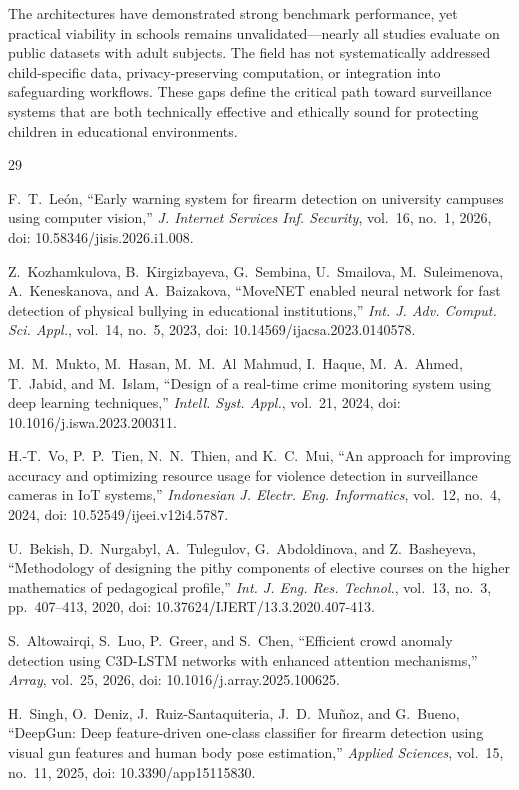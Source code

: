 \documentclass[conference]{IEEEtran}
\begin{document}
The architectures have demonstrated strong benchmark performance, yet practical viability in schools remains unvalidated---nearly all studies evaluate on public datasets with adult subjects. The field has not systematically addressed child-specific data, privacy-preserving computation, or integration into safeguarding workflows. These gaps define the critical path toward surveillance systems that are both technically effective and ethically sound for protecting children in educational environments.

\begin{thebibliography}{29}
\renewcommand{\bibfont}{\scriptsize}

 F.~T.~Le\'{o}n, ``Early warning system for firearm detection on university campuses using computer vision,'' \textit{J. Internet Services Inf. Security}, vol.~16, no.~1, 2026, doi: 10.58346/jisis.2026.i1.008.

 Z.~Kozhamkulova, B.~Kirgizbayeva, G.~Sembina, U.~Smailova, M.~Suleimenova, A.~Keneskanova, and A.~Baizakova, ``MoveNET enabled neural network for fast detection of physical bullying in educational institutions,'' \textit{Int. J. Adv. Comput. Sci. Appl.}, vol.~14, no.~5, 2023, doi: 10.14569/ijacsa.2023.0140578.

 M.~M.~Mukto, M.~Hasan, M.~M.~Al~Mahmud, I.~Haque, M.~A.~Ahmed, T.~Jabid, and M.~Islam, ``Design of a real-time crime monitoring system using deep learning techniques,'' \textit{Intell. Syst. Appl.}, vol.~21, 2024, doi: 10.1016/j.iswa.2023.200311.

 H.-T.~Vo, P.~P.~Tien, N.~N.~Thien, and K.~C.~Mui, ``An approach for improving accuracy and optimizing resource usage for violence detection in surveillance cameras in IoT systems,'' \textit{Indonesian J. Electr. Eng. Informatics}, vol.~12, no.~4, 2024, doi: 10.52549/ijeei.v12i4.5787.

 U.~Bekish, D.~Nurgabyl, A.~Tulegulov, G.~Abdoldinova, and Z.~Basheyeva, ``Methodology of designing the pithy components of elective courses on the higher mathematics of pedagogical profile,'' \textit{Int. J. Eng. Res. Technol.}, vol.~13, no.~3, pp.~407--413, 2020, doi: 10.37624/IJERT/13.3.2020.407-413.

 S.~Altowairqi, S.~Luo, P.~Greer, and S.~Chen, ``Efficient crowd anomaly detection using C3D-LSTM networks with enhanced attention mechanisms,'' \textit{Array}, vol.~25, 2026, doi: 10.1016/j.array.2025.100625.

 H.~Singh, O.~Deniz, J.~Ruiz-Santaquiteria, J.~D.~Mu\~{n}oz, and G.~Bueno, ``DeepGun: Deep feature-driven one-class classifier for firearm detection using visual gun features and human body pose estimation,'' \textit{Applied Sciences}, vol.~15, no.~11, 2025, doi: 10.3390/app15115830.


\end{thebibliography}
\end{document}
